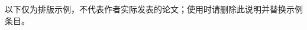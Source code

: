 \begin{sdupublications}

\noindent 以下仅为排版示例，不代表作者实际发表的论文；使用时请删除此说明并替换示例条目。

\cite{publication-example-1}
\cite{publication-example-2}

\end{sdupublications}
